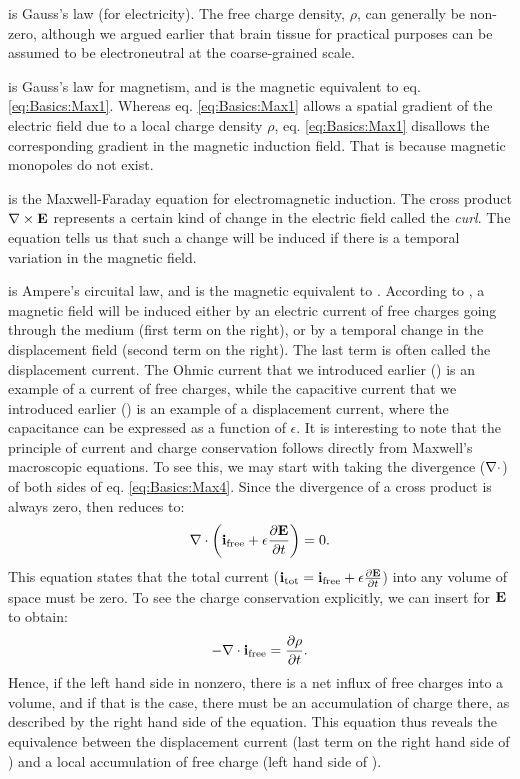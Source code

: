  is Gauss's law (for electricity). The free charge density, $\rho$, can generally be non-zero, although we argued earlier that brain tissue for practical purposes can be assumed to be electroneutral at the coarse-grained scale.

 is Gauss's law for magnetism, and is the magnetic equivalent to eq. \ref{eq:Basics:Max1}. Whereas eq. \ref{eq:Basics:Max1} allows a spatial gradient of the electric field due to a local charge density $\rho$, eq. \ref{eq:Basics:Max1} disallows the corresponding gradient in the magnetic induction field. That is because magnetic monopoles do not exist. 

 is the Maxwell-Faraday equation for electromagnetic induction. The cross product ${\bf \nabla} \times {\bf E}$ represents a certain kind of change in the electric field called the \textit{curl}. The equation tells us that such a change will be induced if there is a temporal variation in the magnetic field.

 is Ampere's circuital law, and is the magnetic equivalent to . According to , a magnetic field will be induced either by an electric current of free charges going through the medium (first term on the right), or by a temporal change in the displacement field (second term on the right). The last term is often called the displacement current. The Ohmic current that we introduced earlier () is an example of a current of free charges, while the capacitive current that we introduced earlier () is an example of a displacement current, where the capacitance can be expressed as a function of $\epsilon$.
%
It is interesting to note that the principle of current and charge conservation follows directly from Maxwell's macroscopic equations. To see this, we may start with taking the divergence (${\bf \nabla} \cdot$) of both sides of eq. \ref{eq:Basics:Max4}. Since the divergence of a cross product is always zero,  then reduces to:
\begin{equation}
{\bf \nabla} \cdot \left( {\bf i}_\text{free} +  \epsilon \frac{\partial {\bf E}}{\partial t} \right) = 0.
\label{eq:Basics:Max4dot}
\end{equation}
This equation states that the total current (${\bf i}_\text{tot} = {\bf i}_\text{free} +  \epsilon \frac{\partial {\bf E}}{\partial t}$) into any volume of space must be zero. To see the charge conservation explicitly, we can insert  for ${\bf E}$ to obtain:
\begin{equation}
- {\bf \nabla} \cdot {\bf i}_\text{free} =  \frac{\partial \rho}{\partial t}.
\label{eq:Basics:currentconservation}
\end{equation}
Hence, if the left hand side in nonzero, there is a net influx of free charges into a volume, and if that is the case, there must be an accumulation of charge there, as described by the right hand side of the equation. This equation thus reveals the equivalence between the displacement current (last term on the right hand side of ) and a local accumulation of free charge (left hand side of ).


